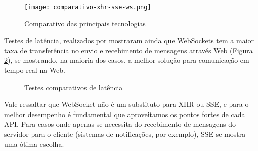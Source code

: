 \begin{figure}[H]
	\centering
	\caption{Comparativo das principais tecnologias}
	\texttt{[image: comparativo-xhr-sse-ws.png]}
	\label{fig:comparativo}
\end{figure}


Testes de latência, realizados por  mostraram ainda que WebSockets tem a maior taxa de transferência no envio e recebimento de mensagens através Web (Figura \ref{fig:latencia}), se mostrando, na maioria dos casos, a melhor solução para comunicação em tempo real na Web.

\begin{figure}[H]
	\centering
	\caption{Testes comparativos de latência}
	\hfill
	\label{fig:latencia}
\end{figure}

Vale ressaltar que WebSocket não é um substituto para XHR ou SSE, e para o melhor desempenho é fundamental que aproveitamos os pontos fortes de cada API. Para casos onde apenas se necessita do recebimento de mensagens do servidor para o cliente (sistemas de notificações, por exemplo), SSE se mostra uma ótima escolha.